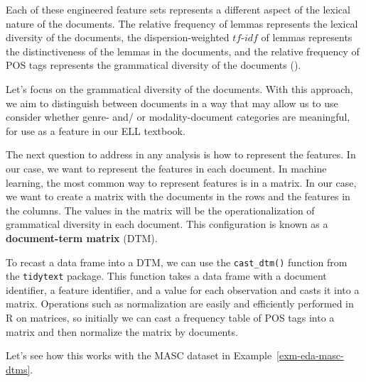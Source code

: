 \documentclass[
  letterpaper,
]{latex/krantz}
\theoremstyle{definition}
\theoremstyle{remark}
\begin{document}
Each of these engineered feature sets represents a different aspect of
the lexical nature of the documents. The relative frequency of lemmas
represents the lexical diversity of the documents, the
dispersion-weighted \(tf\)-\(idf\) of lemmas represents the
distinctiveness of the lemmas in the documents, and the relative
frequency of POS tags represents the grammatical diversity of the
documents ().

Let's focus on the grammatical diversity of the documents. With this
approach, we aim to distinguish between documents in a way that may
allow us to use consider whether genre- and/ or modality-document
categories are meaningful, for use as a feature in our ELL textbook.

The next question to address in any analysis is how to represent the
features. In our case, we want to represent the features in each
document. In machine learning, the most common way to represent features
is in a matrix. In our case, we want to create a matrix with the
documents in the rows and the features in the columns. The values in the
matrix will be the operationalization of grammatical diversity in each
document. This configuration is known as a \textbf{document-term matrix}
(DTM).

To recast a data frame into a DTM, we can use the \texttt{cast\_dtm()}
function from the \texttt{tidytext} package. This function takes a data
frame with a document identifier, a feature identifier, and a value for
each observation and casts it into a matrix. Operations such as
normalization are easily and efficiently performed in R on matrices, so
initially we can cast a frequency table of POS tags into a matrix and
then normalize the matrix by documents.

Let's see how this works with the MASC dataset in
Example~\ref{exm-eda-masc-dtms}.
\end{document}
